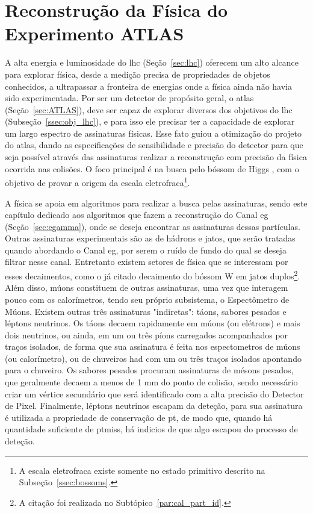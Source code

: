\chapter{Reconstrução da Física do Experimento ATLAS}
\label{cap:reco}

A alta energia e luminosidade do \gls{lhc} (Seção~\ref{sec:lhc}) oferecem um alto alcance para
explorar física, desde a medição precisa de propriedades de objetos conhecidos, a
ultrapassar a fronteira de energias onde a física ainda não havia sido experimentada.
Por ser um detector de propósito geral, o \gls{atlas} (Seção~\ref{sec:ATLAS}), deve ser capaz de
explorar diversos dos objetivos do \gls{lhc} (Subseção~\ref{ssec:obj_lhc}), e
para isso ele precisar ter a capacidade de explorar um largo espectro de assinaturas
físicas. Esse fato guiou a otimização do projeto do \gls{atlas}, dando as especificações de sensibilidade e precisão do
detector para que seja possível através das assinaturas realizar a reconstrução
com precisão da física ocorrida nas colisões. O foco principal é na busca pelo
bóssom de Higgs \cite{ATLAS_TDR2}, com o objetivo de provar a origem da escala
eletrofraca\footnote{A escala eletrofraca existe somente no estado primitivo descrito na
Subseção~\ref{ssec:bossoms}.}. 

A física se apoia em algoritmos
para realizar a busca pelas assinaturas, sendo este capítulo dedicado aos
algoritmos que fazem a reconstrução do Canal \gls{eg} (Seção~\ref{sec:egamma}),
onde se deseja encontrar as assinaturas dessas partículas.
Outras assinaturas experimentais são as de hádrons e jatos, que serão tratadas
quando abordando o Canal \gls{eg}, por serem o ruído de fundo do qual se deseja
filtrar nesse canal. Entretanto existem setores de física que se
interessam por esses decaimentos, como o já citado decaimento do bóssom W em jatos
duplos\footnote{A citação foi realizada no Subtópico~\ref{par:cal_part_id}.}. 
Além disso, múons constituem de outras assinaturas, uma vez que interagem
pouco com os calorímetros, tendo seu próprio subsistema, o Espectômetro de
Múons. Existem outras três assinaturas "indiretas": 
táons, sabores pesados e léptons neutrinos. Os táons decaem
rapidamente em múons (ou elétrons) e mais dois neutrinos, ou ainda, em um ou três
píons carregados acompanhados por traços isolados, de forma que sua assinatura é
feita nos espectometros de múons (ou calorímetro), ou de chuveiros \gls{had} com um ou três
traços isolados apontando para o chuveiro. Os sabores pesados procuram
assinaturas de mésons pesados, que geralmente decaem a menos de 1 mm do ponto de
colisão, sendo necessário criar um vértice secundário que será identificado com
a alta precisão do Detector de Pixel. Finalmente, léptons neutrinos escapam da
deteção, para sua assinatura é utilizada a propriedade de conservação de
\gls{pt}, de modo que, quando há quantidade suficiente de \gls{ptmiss}, há indicios
de que algo escapou do processo de deteção.

